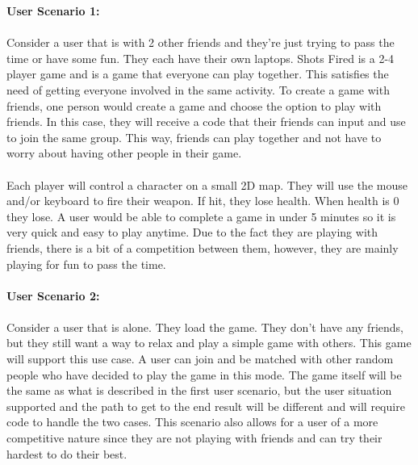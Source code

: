 \documentclass[11pt, oneside]{article}   	%
\begin{document}
\textbf{User Scenario 1:}\\\\
\indent Consider a user that is with 2 other friends and they’re just trying to pass the time or have some fun. They each have their own laptops. Shots Fired is a 2-4 player game and is a game that everyone can play together. This satisfies the need of getting everyone involved in the same activity. To create a game with friends, one person would create a game and choose the option to play with friends. In this case, they will receive a code that their friends can input and use to join the same group. This way, friends can play together and not have to worry about having other people in their game. \\\\
\indent Each player will control a character on a small 2D map. They will use the mouse and/or keyboard to fire their weapon. If hit, they lose health. When health is 0 they lose. A user would be able to complete a game in under 5 minutes so it is very quick and easy to play anytime. Due to the fact they are playing with friends, there is a bit of a competition between them, however, they are mainly playing for fun to pass the time. \\\\
\textbf{User Scenario 2:}\\\\
\indent Consider a user that is alone. They load the game. They don’t have any friends, but they still want a way to relax and play a simple game with others. This game will support this use case. A user can join and be matched with other random people who have decided to play the game in this mode. The game itself will be the same as what is described in the first user scenario, but the user situation supported and the path to get to the end result will be different and will require code to handle the two cases. This scenario also allows for a user of a more competitive nature since they are not playing with friends and can try their hardest to do their best. 
\end{document}
